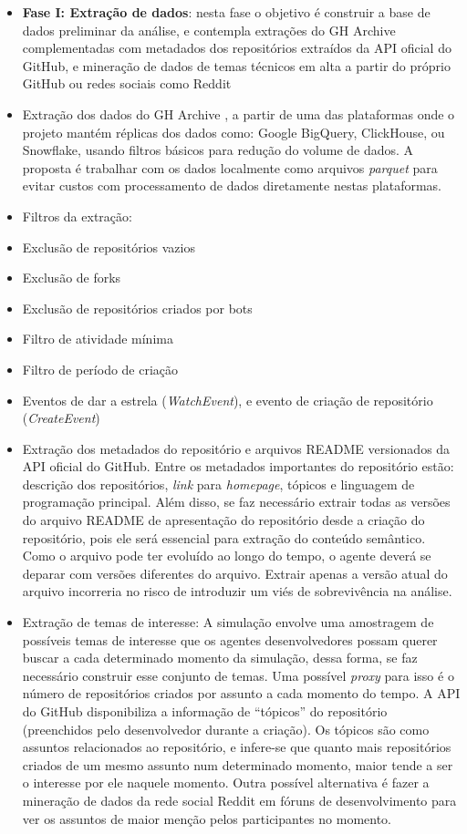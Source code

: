\documentclass[12pt,oneside,a4paper,brazil,sumario=tradicional]{abntex2}
\begin{document}
\begin{itemize}
  \item \textbf{Fase I: Extração de dados}:  nesta fase o objetivo é construir a base de dados preliminar da análise, e contempla extrações do GH Archive complementadas com metadados dos repositórios extraídos da API oficial do GitHub, e mineração de dados de temas técnicos em alta a partir do próprio GitHub ou redes sociais como Reddit
  \item Extração dos dados do GH Archive \cite{grigorik_gharchive}, a partir de uma das plataformas onde o projeto mantém réplicas dos dados como: Google BigQuery, ClickHouse, ou Snowflake, usando filtros básicos para redução do volume de dados. A proposta é trabalhar com os dados localmente como arquivos \textit{parquet }\cite{apacheparquet2024} para evitar custos com processamento de dados diretamente nestas plataformas.
  \item Filtros da extração:
  \item Exclusão de repositórios vazios
  \item Exclusão de forks
  \item Exclusão de repositórios criados por bots
  \item Filtro de atividade mínima
  \item Filtro de período de criação
  \item Eventos de dar a estrela (\textit{WatchEvent}), e evento de criação de repositório (\textit{CreateEvent})
  \item Extração dos metadados do repositório e arquivos README versionados da API oficial do GitHub. Entre os metadados importantes do repositório estão: descrição dos repositórios, \textit{link }para \textit{homepage}, tópicos e linguagem de programação principal. Além disso, se faz necessário extrair todas as versões do arquivo README de apresentação do repositório desde a criação do repositório, pois ele será essencial para extração do conteúdo semântico. Como o arquivo pode ter evoluído ao longo do tempo, o agente deverá se deparar com versões diferentes do arquivo. Extrair apenas a versão atual do arquivo incorreria no risco de introduzir um viés de sobrevivência na análise.
  \item Extração de temas de interesse: A simulação envolve uma amostragem de possíveis temas de interesse que os agentes desenvolvedores possam querer buscar a cada determinado momento da simulação, dessa forma, se faz necessário construir esse conjunto de temas. Uma possível \textit{proxy }para isso é o número de repositórios criados por assunto a cada momento do tempo. A API do GitHub disponibiliza a informação de “tópicos” do repositório (preenchidos pelo desenvolvedor durante a criação).  Os  tópicos são como assuntos relacionados ao repositório, e infere-se que quanto mais repositórios criados de um mesmo assunto num determinado momento, maior tende a ser o interesse por ele naquele momento. Outra possível alternativa é fazer a mineração de dados da rede social Reddit em fóruns de desenvolvimento para ver os assuntos de maior menção pelos participantes no momento.

\end{itemize}
\end{document}
